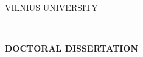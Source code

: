 
\thispagestyle{empty}                   %
{\selectfont
\linespread{1.15}\selectfont
\renewcommand\bfdefault{m}%


\begin{flushright}
    \thesisDOI \\
    \thesisORCID
\end{flushright}

\begin{center}
	\vspace*{5mm}	
	\begin{flushleft}
         \fontsize{12}{12}\selectfont
	       VILNIUS UNIVERSITY \\
	\end{flushleft}
 
	\vspace{50mm minus 45mm}
	\begin{flushleft}
	   {\fontsize{15}{15}\selectfont  \thesisAuthorName  \  \thesisAuthorSurname \par}
    \end{flushleft}

	\vspace{10mm}
	\begin{flushleft}
    	{ \fontsize{21}{21}\selectfont
    	   \thesisTitleEN \par
    	}
    \end{flushleft}

    \vspace{70mm minus 45mm}
    \begin{flushleft}
        \renewcommand\bfdefault{b}
        \fontsize{12}{12}\selectfont
        {\bf DOCTORAL DISSERTATION}\\ 
    \end{flushleft}
    

\end{center}}
